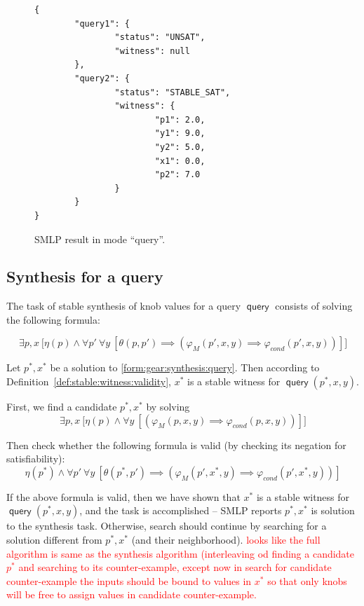 \documentclass[a4paper,parskip=half]{article} %
\newcommand*\query{\operatorname{\mathsf{query}}}
\newcommand\todozk[1]{\textcolor{red}{#1}}
\newcommand*\ZK{\todozk}
\begin{document}
\begin{figure}
\small
\begin{verbatim}
{
        "query1": {
                "status": "UNSAT",
                "witness": null
        },
        "query2": {
                "status": "STABLE_SAT",
                "witness": {
                        "p1": 2.0,
                        "y1": 9.0,
                        "y2": 5.0,
                        "x1": 0.0,
                        "p2": 7.0
                }
        }
}
\end{verbatim}
\caption{SMLP result in mode ``query''.}\label{fig:query:result}
\end{figure}


\subsection{Synthesis for a query}


The task of stable synthesis of knob values for a query $\query$ consists of solving the following formula:

\begin{equation}\label{form:gear:synthesis:query}
    \exists p, x ~\big[ \eta(p) \wedge
    \forall p'~
    \forall y~[
    \theta(p,p') \implies (\varphi_M(p',x,y)  \implies  \varphi_{\mathit{cond}}(p',x,y))
    ]\big]
\end{equation} 

Let $p^*, x^*$ be a solution to \cref{form:gear:synthesis:query}. Then according to Definition~\ref{def:stable:witness:validity}, 
$x^*$ is a stable witness for  $\query(p^*, x, y)$. 



First, we find a candidate $p^*, x^*$ by solving
\begin{equation}\label{form:gear:synthesis:query}
    \exists p, x ~\big[ \eta(p) \wedge
    \forall y~[
    (\varphi_M(p,x,y)  \implies  \varphi_{\mathit{cond}}(p,x,y))
    ]\big]
\end{equation} 

Then check whether the following formula is valid (by checking its negation for satisfiability): 
\begin{equation}\label{form:gear:synthesis:query}
    \eta(p^*) \wedge
    \forall p'~
    \forall y~[
    \theta(p^*,p') \implies (\varphi_M(p',x^*,y)  \implies  \varphi_{\mathit{cond}}(p',x^*,y))
    ]
\end{equation} 

If the above formula is valid, then we have shown that $x^*$ is a stable witness for  $\query(p^*, x, y)$, 
and the task is accomplished -- SMLP reports $p^*, x^*$ is solution to the synthesis task. Otherwise,
search should continue by searching for a solution different from $p^*, x^*$ (and their neighborhood).
\ZK{looks like the full algorithm is same as the synthesis algorithm (interleaving od finding a candidate $p^*$
and searching to its counter-example, except now in search for candidate counter-example the inputs should
be bound to values in $x^*$ so that only knobs will be free to assign values in candidate counter-example.}
\end{document}
